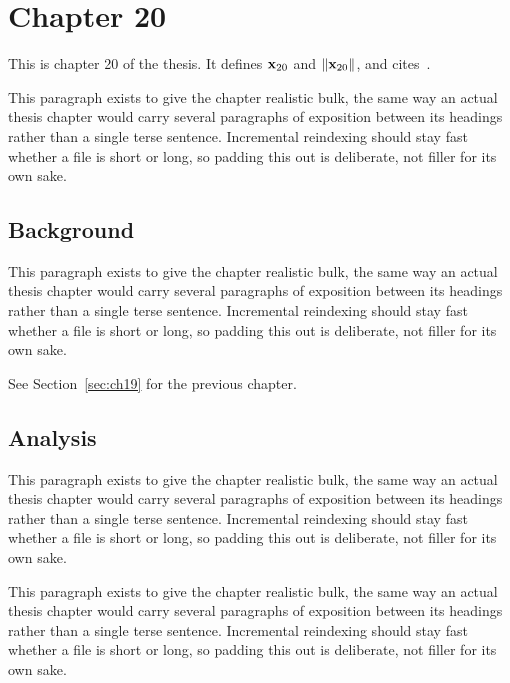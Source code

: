 \section{Chapter 20}
\label{sec:ch20}

This is chapter 20 of the thesis. It defines $\mathbf{x}_{20}$ and $\lVert \mathbf{x}_{20} \rVert$, and cites~\cite{ref1}.

This paragraph exists to give the chapter realistic bulk, the same way an actual thesis chapter would carry several paragraphs of exposition between its headings rather than a single terse sentence. Incremental reindexing should stay fast whether a file is short or long, so padding this out is deliberate, not filler for its own sake.

\subsection{Background}
\label{sec:ch20:background}

This paragraph exists to give the chapter realistic bulk, the same way an actual thesis chapter would carry several paragraphs of exposition between its headings rather than a single terse sentence. Incremental reindexing should stay fast whether a file is short or long, so padding this out is deliberate, not filler for its own sake.

See Section~\ref{sec:ch19} for the previous chapter.

\subsection{Analysis}
\label{sec:ch20:analysis}

This paragraph exists to give the chapter realistic bulk, the same way an actual thesis chapter would carry several paragraphs of exposition between its headings rather than a single terse sentence. Incremental reindexing should stay fast whether a file is short or long, so padding this out is deliberate, not filler for its own sake.

This paragraph exists to give the chapter realistic bulk, the same way an actual thesis chapter would carry several paragraphs of exposition between its headings rather than a single terse sentence. Incremental reindexing should stay fast whether a file is short or long, so padding this out is deliberate, not filler for its own sake.

